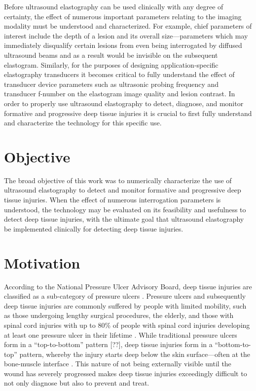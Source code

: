 \documentclass[12pt]{book}
\begin{document}
	Before ultrasound elastography can be used clinically with any degree of certainty, the effect of numerous important parameters relating to the imaging modality must be understood and characterized. For example, chief parameters of interest include the depth of a lesion and its overall size---parameters which may immediately disqualify certain lesions from even being interrogated by diffused ultrasound beams and as a result would be invisible on the subsequent elastogram. Similarly, for the purposes of designing application-specific elastography transducers it becomes critical to fully understand the effect of transducer device parameters such as ultrasonic probing frequency and transducer f-number on the elastogram image quality and lesion contrast. In order to properly use ultrasound elastography to detect, diagnose, and monitor formative and progressive deep tissue injuries it is crucial to first fully understand and characterize the technology for this specific use.

	\section{Objective}
		The broad objective of this work was to numerically characterize the use of ultrasound elastography to detect and monitor formative and progressive deep tissue injuries. When the effect of numerous interrogation parameters is understood, the technology may be evaluated on its feasibility and usefulness to detect deep tissue injuries, with the ultimate goal that ultrasound elastography be implemented clinically for detecting deep tissue injuries.

	\section{Motivation}
		According to the National Pressure Ulcer Advisory Board, deep tissue injuries are classified as a sub-category of pressure ulcers \cite{black11}. Pressure ulcers and subsequently deep tissue injuries are commonly suffered by people with limited mobility, such as those undergoing lengthy surgical procedures, the elderly, and those with spinal cord injuries \cite{allman95} with up to \unit{80}{\%} of people with spinal cord injuries developing at least one pressure ulcer in their lifetime \cite{salzberg96}. While traditional pressure ulcers form in a ``top-to-bottom'' pattern [??], deep tissue injuries form in a ``bottom-to-top'' pattern, whereby the injury starts deep below the skin surface---often at the bone-muscle interface \cite{kanno09}. This nature of not being externally visible until the wound has severely progressed makes deep tissue injuries exceedingly difficult to not only diagnose but also to prevent and treat.
\end{document}
